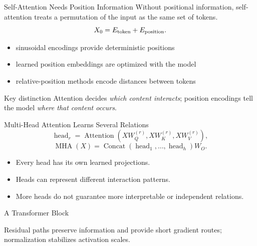 \documentclass[10pt,aspectratio=169]{ntuabeamer}
\begin{document}
\begin{frame}{Self-Attention Needs Position Information}
  Without positional information, self-attention treats a permutation of the input as the same set of tokens.
  \[
    X_0=E_{\rm token}+E_{\rm position}.
  \]
  \begin{itemize}
    \item sinusoidal encodings provide deterministic positions
    \item learned position embeddings are optimized with the model
    \item relative-position methods encode distances between tokens
  \end{itemize}
  \begin{block}{Key distinction}
    Attention decides \emph{which content interacts}; position encodings tell the model \emph{where that content occurs}.
  \end{block}
\end{frame}

\begin{frame}{Multi-Head Attention Learns Several Relations}
  \[
    \operatorname{head}_r
    =\operatorname{Attention}(XW_Q^{(r)},XW_K^{(r)},XW_V^{(r)}),
  \]
  \[
    \operatorname{MHA}(X)
    =\operatorname{Concat}(\operatorname{head}_1,\ldots,\operatorname{head}_h)W_O.
  \]
  \begin{itemize}
    \item Every head has its own learned projections.
    \item Heads can represent different interaction patterns.
    \item More heads do not guarantee more interpretable or independent relations.
  \end{itemize}
\end{frame}

\begin{frame}{A Transformer Block}
  \begin{center}
  \end{center}
  Residual paths preserve information and provide short gradient routes; normalization stabilizes activation scales.
\end{frame}
\end{document}
